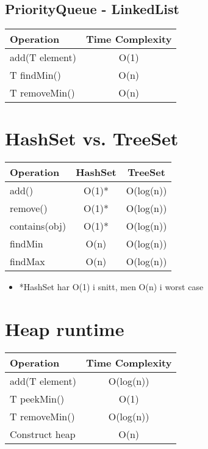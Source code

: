 \documentclass{article}
\begin{document}
\subsection{PriorityQueue - LinkedList}
\begin{table}[h!]
\centering
\begin{tabular}{|l|c|}
\hline
\textbf{Operation} & \textbf{Time Complexity} \\
\hline
add(T element) & O(1) \\
\hline
T findMin() & O(n) \\
\hline
T removeMin() & O(n) \\
\hline
\end{tabular}
\end{table}

\newpage


\section{HashSet vs. TreeSet}
\begin{table}[h!]
\centering
\begin{tabular}{|l|c|c|}
\hline
\textbf{Operation} & \textbf{HashSet} & \textbf{TreeSet} \\
\hline
add() & O(1)* & O(log(n)) \\
\hline
remove() & O(1)* & O(log(n)) \\
\hline
contains(obj) & O(1)* & O(log(n)) \\
\hline
findMin & O(n) & O(log(n))\\
\hline
findMax & O(n) & O(log(n))\\
\hline
\end{tabular}
\end{table}
\begin{itemize}
  \item *HashSet har O(1) i snitt, men O(n) i worst case
\end{itemize}



\section{Heap runtime}
\begin{table}[h!]
\centering
\begin{tabular}{|l|c|}
\hline
\textbf{Operation} & \textbf{Time Complexity} \\
\hline
add(T element) & O(log(n)) \\
\hline
T peekMin() & O(1) \\
\hline
T removeMin() & O(log(n)) \\
\hline
Construct heap & O(n) \\
\hline
\end{tabular}
\end{table}
\end{document}
